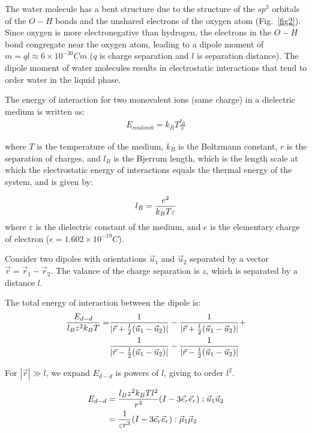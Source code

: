 \documentclass[book.tex]{subfiles}
\begin{document}
The water molecule has a bent structure due to the structure of 
the $sp^3$ orbitals of the $O-H$ bonds and the unshared electrons of the oxygen atom (Fig.~\ref{fig2}). Since oxygen is more electronegative than hydrogen, the electrons in the $O-H$ bond congregate near the oxygen atom, leading to a dipole moment of $m = ql\approx 6\times 10^{-30}Cm$ ($q$ is charge separation and $l$ is separation distance). The dipole moment of water molecules results in electrostatic interactions that tend to order water in the liquid phase.

The energy of interaction for two monovalent ions (same charge) in a dielectric medium is written as:
\begin{align}\label{Eq1}
E_{coulomb}=k_BT\frac{l_B}{r}
\end{align}

\noindent where $T$ is the temperature of the medium, $k_B$ is the Boltzmann constant, $r$ is the separation of charges, and $l_B$ is the Bjerrum length, which is the length scale at which the electrostatic energy of interactions equals the thermal energy of the system, and is given by:

\begin{align}\label{Eq2}
l_B= \frac{e^2}{k_BT\varepsilon} \notag
\end{align} 
where $\varepsilon$ is the dielectric constant of the medium, and $e$ is the elementary charge of electron ($e=1.602 \times 10^{-19} C$).

Consider two dipoles with orientations $\vec{u}_1$ and $\vec{u}_2$ separated by a vector $\vec{r} =\vec{r}_1-\vec{r}_2$. The valance of the charge separation is $z$, which is separated by a distance $l$.

The total energy of interaction between the dipole is:
\begin{align}
\frac{E_{d-d}}{l_Bz^2k_BT} = &\frac{1}{|\vec{r} + \frac{l}{2}(\vec{u}_1 - \vec{u}_2)|} - \frac{1}{|\vec{r} + \frac{l}{2}(\vec{u}_1 - \vec{u}_2)|} + \notag\\
&\frac{1}{|\vec{r} - \frac{l}{2}(\vec{u}_1 - \vec{u}_2)|} - \frac{1}{|\vec{r} - \frac{l}{2}(\vec{u}_1 - \vec{u}_2)|} \notag
\end{align}

For $|\vec{r}|\gg l$, we expand $E_{d-d}$ is powers of $l$, giving to order $l^2$.

\begin{align}
E_{d-d} &= \frac{l_Bz^2k_BTl^2}{r^3}(I - 3\vec{e}_r\vec{e}_r):\vec{u}_1\vec{u}_2 \notag\\ 
&= \frac{1}{\varepsilon r^3}(I - 3\vec{e}_r\vec{e}_r):\vec{\mu}_1\vec{\mu}_2 \notag
\end{align}
\end{document}
